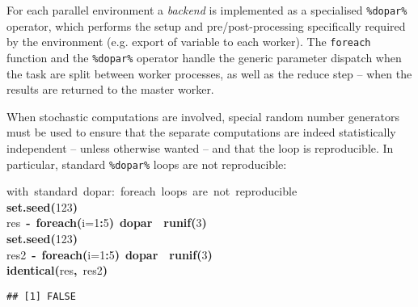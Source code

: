 \documentclass[a4paper,12pt]{article}\usepackage{graphicx, color}
\makeatletter
\newcommand{\hlnumber}[1]{\textcolor[rgb]{0,0,0}{#1}}%
\newcommand{\hlfunctioncall}[1]{\textcolor[rgb]{0.501960784313725,0,0.329411764705882}{\textbf{#1}}}%
\newcommand{\hlkeyword}[1]{\textcolor[rgb]{0,0,0}{\textbf{#1}}}%
\newcommand{\hlargument}[1]{\textcolor[rgb]{0.690196078431373,0.250980392156863,0.0196078431372549}{#1}}%
\newcommand{\hlcomment}[1]{\textcolor[rgb]{0.180392156862745,0.6,0.341176470588235}{#1}}%
\newcommand{\hlassignement}[1]{\textcolor[rgb]{0,0,0}{\textbf{#1}}}%
\newcommand{\hlsymbol}[1]{\textcolor[rgb]{0,0,0}{#1}}%
\newcommand{\hlstd}[1]{\textcolor[rgb]{0,0,0}{#1}}%
\newenvironment{kframe}{%
 \def\FrameCommand##1{\hskip\@totalleftmargin \hskip-\fboxsep
 \colorbox{shadecolor}{##1}\hskip-\fboxsep
     \hskip-\linewidth \hskip-\@totalleftmargin \hskip\columnwidth}%
 \MakeFramed {\advance\hsize-\width
   \@totalleftmargin\z@ \linewidth\hsize
   \@setminipage}}%
 {\par\unskip\endMakeFramed}
\newenvironment{knitrout}{}{} %
\renewenvironment{knitrout}{\begin{footnotesize}}{\end{footnotesize}}
\let\code=\texttt
\makeatother
\begin{document}
For each parallel environment a \emph{backend} is implemented as a specialised \code{\%dopar\%} operator, which performs the setup and pre/post-processing specifically required by the environment (e.g. export of variable to each worker).
The \code{foreach} function and the \code{\%dopar\%} operator handle the generic
parameter dispatch when the task are split between worker processes, as well
as the reduce step -- when the results are returned to the master worker.

When stochastic computations are involved, special random number generators must
be used to ensure that the separate computations are indeed statistically independent -- unless otherwise wanted -- and that the loop is reproducible.
In particular, standard \code{\%dopar\%} loops are not reproducible:
\begin{knitrout}
\color{fgcolor}\begin{kframe}
\begin{flushleft}
\ttfamily\noindent
\hlcomment{\usebox{\hlnormalsizeboxhash}{\ }with{\ }standard{\ }\usebox{\hlnormalsizeboxpercent}dopar\usebox{\hlnormalsizeboxpercent}:{\ }foreach{\ }loops{\ }are{\ }not{\ }reproducible}\hspace*{\fill}\\
\hlstd{}\hlfunctioncall{set.seed}\hlkeyword{(}\hlnumber{123}\hlkeyword{)}\hspace*{\fill}\\
\hlstd{}\hlsymbol{res}{\ }\hlassignement{\usebox{\hlnormalsizeboxlessthan}-}{\ }\hlfunctioncall{foreach}\hlkeyword{(}\hlargument{i}\hlargument{=}\hlnumber{1}\hlkeyword{:}\hlnumber{5}\hlkeyword{)}{\ }\hlkeyword{\usebox{\hlnormalsizeboxpercent}dopar\usebox{\hlnormalsizeboxpercent}}{\ }\hlkeyword{\usebox{\hlnormalsizeboxopenbrace}}{\ }\hlfunctioncall{runif}\hlkeyword{(}\hlnumber{3}\hlkeyword{)}{\ }\hlkeyword{\usebox{\hlnormalsizeboxclosebrace}}\hspace*{\fill}\\
\hlstd{}\hlfunctioncall{set.seed}\hlkeyword{(}\hlnumber{123}\hlkeyword{)}\hspace*{\fill}\\
\hlstd{}\hlsymbol{res2}{\ }\hlassignement{\usebox{\hlnormalsizeboxlessthan}-}{\ }\hlfunctioncall{foreach}\hlkeyword{(}\hlargument{i}\hlargument{=}\hlnumber{1}\hlkeyword{:}\hlnumber{5}\hlkeyword{)}{\ }\hlkeyword{\usebox{\hlnormalsizeboxpercent}dopar\usebox{\hlnormalsizeboxpercent}}{\ }\hlkeyword{\usebox{\hlnormalsizeboxopenbrace}}{\ }\hlfunctioncall{runif}\hlkeyword{(}\hlnumber{3}\hlkeyword{)}{\ }\hlkeyword{\usebox{\hlnormalsizeboxclosebrace}}\hspace*{\fill}\\
\hlstd{}\hlfunctioncall{identical}\hlkeyword{(}\hlsymbol{res}\hlkeyword{,}{\ }\hlsymbol{res2}\hlkeyword{)}\mbox{}
\normalfont
\end{flushleft}
\begin{verbatim}
## [1] FALSE
\end{verbatim}
\end{kframe}
\end{knitrout}
\end{document}
